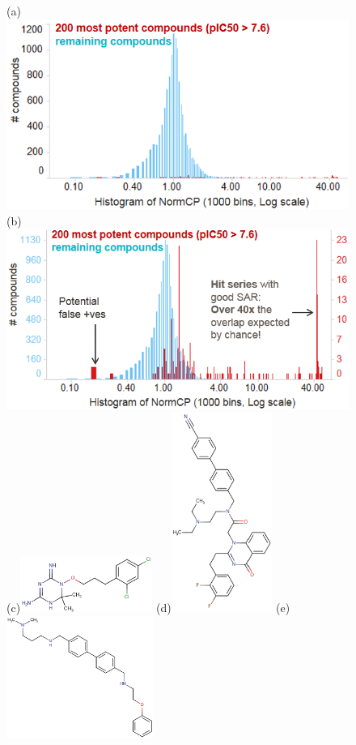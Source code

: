 \documentclass[journal=jacsat,biochem,manuscript=article]{achemso}
\begin{document}
\begin{figure}
  (a)\includegraphics[width=4.5in]{fig/NormCP_all.png}\\
  (b)\includegraphics[width=4.5in]{fig/NormCP_top200.png}\\
  (c)\includegraphics[width=1.7in]{fig/NormCP=42_5_pIC50=8_49_CID524739_v2.png}
  (d)\includegraphics[width=1.3in]{fig/NormCP=0_17_pIC50=8_22_CID541941_v2.png}
  (e)\includegraphics[width=1.9in]{fig/NormCP=0_16_pIC50=7_73_CID531249_v2.png}  

\end{figure}
\end{document}
